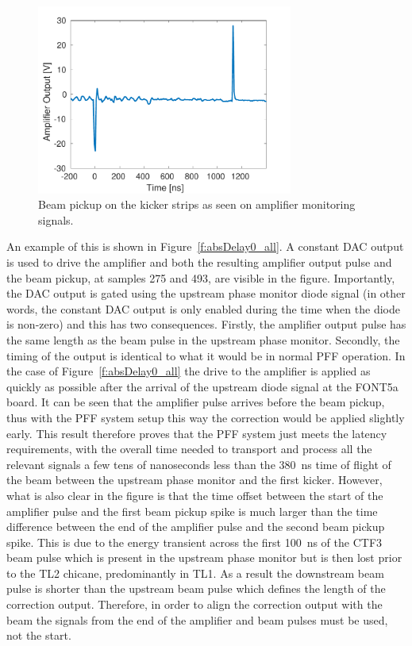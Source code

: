 \begin{figure}
  \centering
  \includegraphics[width=0.75\textwidth]{Figures/commissioning/beamPickup_noKick}
  \caption{Beam pickup on the kicker strips as seen on amplifier monitoring signals.}
  \label{f:beamPickup_noKick}
\end{figure}

An example of this is shown in Figure~\ref{f:absDelay0_all}. A constant DAC output is used to drive the amplifier and both the resulting amplifier output pulse and the beam pickup, at samples 275 and 493, are visible in the figure. Importantly, the DAC output is gated using the upstream phase monitor diode signal (in other words, the constant DAC output is only enabled during the time when the diode is non-zero) and this has two consequences. Firstly, the amplifier output pulse has the same length as the beam pulse in the upstream phase monitor. Secondly, the timing of the output is identical to what it would be in normal PFF operation. In the case of Figure~\ref{f:absDelay0_all} the drive to the amplifier is applied as quickly as possible after the arrival of the upstream diode signal at the FONT5a board. It can be seen that the amplifier pulse arrives before the beam pickup, thus with the PFF system setup this way the correction would be applied slightly early. This result therefore proves that the PFF system just meets the latency requirements, with the overall time needed to transport and process all the relevant signals a few tens of nanoseconds less than the 380~ns time of flight of the beam between the upstream phase monitor and the first kicker. However, what is also clear in the figure is that the time offset between the start of the amplifier pulse and the first beam pickup spike is much larger than the time difference between the end of the amplifier pulse and the second beam pickup spike. This is due to the energy transient across the first 100~ns of the CTF3 beam pulse which is present in the upstream phase monitor but is then lost prior to the TL2 chicane, predominantly in TL1. As a result the downstream beam pulse is shorter than the upstream beam pulse which defines the length of the correction output. Therefore, in order to align the correction output with the beam the signals from the end of the amplifier and beam pulses must be used, not the start.

